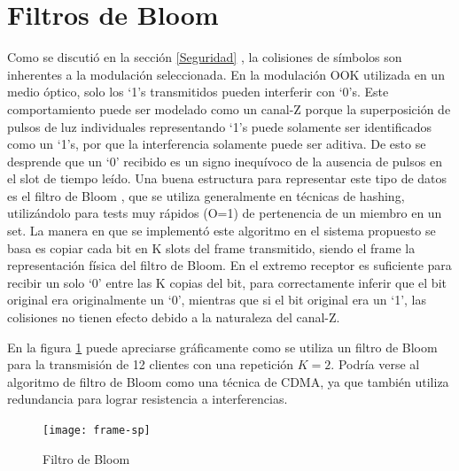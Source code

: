 \section{Filtros de Bloom}
\label{bloomf}
Como se discutió en la sección \ref{Seguridad} , la colisiones de símbolos son inherentes a la modulación seleccionada.
En la modulación OOK utilizada en un medio óptico, solo los ‘1’s transmitidos pueden interferir con ‘0’s. Este comportamiento puede ser modelado como un canal-Z porque la superposición de pulsos de luz individuales representando ‘1’s puede solamente ser identificados como un ‘1’s, por que la interferencia solamente puede ser aditiva. De esto se desprende que un ‘0’ recibido es un signo inequívoco de la ausencia de pulsos en el slot de tiempo leído.
Una buena estructura para representar este tipo de datos es el filtro de Bloom \cite{Bloom70space/timetrade-offs}, que se utiliza generalmente en técnicas de hashing, utilizándolo para tests muy rápidos (O=1) de pertenencia de un miembro en un set.
La manera en que se implementó este algoritmo en el sistema propuesto se basa es copiar cada bit en K slots del frame transmitido, siendo el frame la representación física del filtro de Bloom.
En el extremo receptor es suficiente para recibir un solo ‘0’ entre las K copias del bit, para correctamente inferir que el bit original era originalmente un ‘0’, mientras que si el bit original era un ‘1’, las colisiones no tienen efecto debido a la naturaleza del canal-Z.

En la figura \ref{fig:bloomf} puede apreciarse gráficamente como se utiliza un filtro de Bloom para la transmisión de 12 clientes con una repetición $K=2$. Podría verse al algoritmo de filtro de Bloom como una técnica de CDMA, ya que también utiliza redundancia para lograr resistencia a interferencias.

\begin{figure}[th]
  \begin{center}
    \texttt{[image: frame-sp]}
  \end{center}
  \caption{Filtro de Bloom}
  \label{fig:bloomf}
\end{figure}


